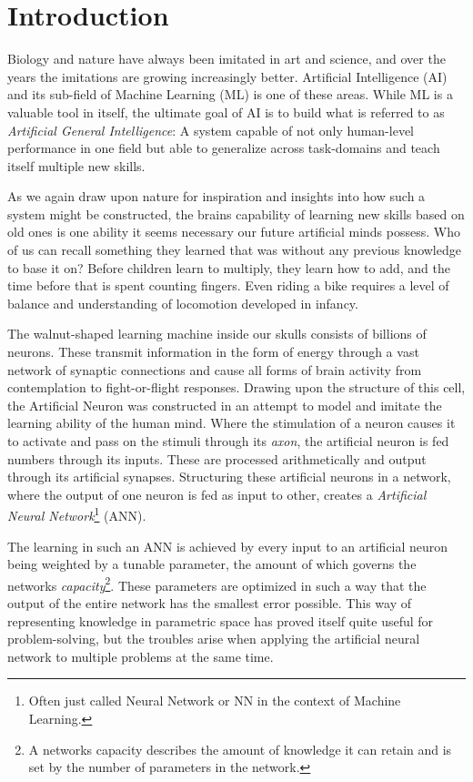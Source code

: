 \chapter{Introduction}

Biology and nature have always been imitated in art and science, and over the years the imitations are growing increasingly better. Artificial Intelligence (AI) and its sub-field of Machine Learning (ML) is one of these areas. While ML is a valuable tool in itself, the ultimate goal of AI is to build what is referred to as \textit{Artificial General Intelligence}: A system capable of not only human-level performance in one field but able to generalize across task-domains and teach itself multiple new skills. 

As we again draw upon nature for inspiration and insights into how such a system might be constructed, the brains capability of learning new skills based on old ones is one ability it seems necessary our future artificial minds possess. Who of us can recall something they learned that was without any previous knowledge to base it on? Before children learn to multiply, they learn how to add, and the time before that is spent counting fingers. Even riding a bike requires a level of balance and understanding of locomotion developed in infancy.

The walnut-shaped learning machine inside our skulls consists of billions of neurons. These transmit information in the form of energy through a vast network of synaptic connections and cause all forms of brain activity from contemplation to fight-or-flight responses. Drawing upon the structure of this cell, the Artificial Neuron was constructed in an attempt to model and imitate the learning ability of the human mind. Where the stimulation of a neuron causes it to activate and pass on the stimuli through its \textit{axon}, the artificial neuron is fed numbers through its inputs. These are processed arithmetically and output through its artificial synapses. Structuring these artificial neurons in a network, where the output of one neuron is fed as input to other, creates a \textit{Artificial Neural Network}\footnote{Often just called Neural Network or NN in the context of Machine Learning.} (ANN). 

The learning in such an ANN is achieved by every input to an artificial neuron being weighted by a tunable parameter, the amount of which governs the networks \textit{capacity}\footnote{A networks capacity describes the amount of knowledge it can retain and is set by the number of parameters in the network.}. These parameters are optimized in such a way that the output of the entire network has the smallest error possible. This way of representing knowledge in parametric space has proved itself quite useful for problem-solving, but the troubles arise when applying the artificial neural network to multiple problems at the same time.

